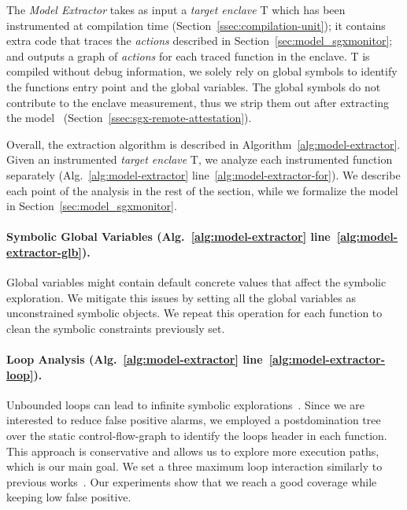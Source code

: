 The \emph{Model Extractor} takes as input a \emph{target enclave} T which has 
been instrumented at compilation time (Section~\ref{ssec:compilation-unit});
\ie it contains extra code that traces the \emph{actions} described in 
Section~\ref{sec:model_sgxmonitor}; and outputs a graph of \emph{actions} for 
each traced 
function in the enclave.
T is compiled without debug information, we solely rely on global symbols to 
identify the functions entry point and the global variables.
The global symbols do not contribute to the enclave measurement, thus we strip 
them out after extracting the model~\citep{intel2} 
(Section~\ref{ssec:sgx-remote-attestation}). 

Overall, the extraction algorithm is described in 
Algorithm~\ref{alg:model-extractor}. Given an instrumented \emph{target 
	enclave} T, we analyze each instrumented function separately 
(Alg.~\ref{alg:model-extractor} line~\ref{alg:model-extractor-for}).
We describe each point of the analysis in the rest of the section, while we 
formalize the model in Section~\ref{sec:model_sgxmonitor}.

\paragraph{Symbolic Global Variables (Alg.~\ref{alg:model-extractor} 
	line~\ref{alg:model-extractor-glb}).} 
Global variables might contain default concrete values that affect the symbolic 
exploration.
We mitigate this issues by setting all the global variables as unconstrained
symbolic objects. 
We repeat this operation for each function to clean the symbolic constraints 
previously set. 

\paragraph{Loop Analysis (Alg.~\ref{alg:model-extractor} 
	line~\ref{alg:model-extractor-loop}).}

Unbounded loops can lead to infinite symbolic 
explorations~\citep{10.1007/978-3-642-36742-7_47}.
Since we are interested to reduce false positive alarms, we employed a 
postdomination tree~\citep{dominators} over the static control-flow-graph to 
identify the loops header in each function.
This approach is conservative and allows us to explore more execution paths, 
which is our main goal.
We set a three maximum loop interaction similarly to previous 
works~\citep{wang2009intscope}.
Our experiments show that we reach a good coverage while keeping low false 
positive.

